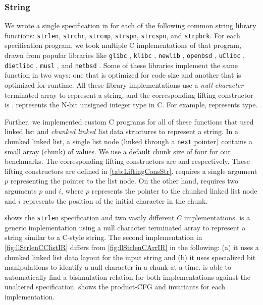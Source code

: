 

\subsubsection{String}
We wrote a single specification in \SpecL{} for each of the following
common string library functions: {\tt strlen}, {\tt strchr}, {\tt strcmp}, {\tt strspn},
{\tt strcspn}, and {\tt strpbrk}.  For each specification
program, we took multiple C implementations of that program, drawn from popular
libraries like {\tt glibc} \cite{glibc}, {\tt klibc} \cite{klibc}, {\tt newlib} \cite{newlib},
{\tt openbsd} \cite{openbsdlibc}, {\tt uClibc} \cite{uclibc},
{\tt dietlibc} \cite{dietlibc}, {\tt musl} \cite{musl}, and {\tt netbsd} \cite{netbsd}.
Some of these libraries implement the same function in two ways: one that is optimized
for code size and another that is optimized for runtime.
All these library implementations use a {\em null character} terminated array to represent
a string, and the
corresponding lifting constructor is .
 represents the N-bit unsigned integer type in C.
For example,  represents  type.

Further, we implemented
custom C programs for all of these functions that used
linked list
and {\em chunked linked list} data structures
to represent a string.
In a chunked linked list, a single list node (linked
through a {\tt next} pointer)
contains a small array (chunk) of values.
We use a default chunk size of four for our
benchmarks.
The corresponding lifting constructors are 
and  respectively.
These lifting constructors are defined in \cref{tab:LiftingConsStr}.
 requires a single
argument $p$ representing the pointer to the list node.
On the other hand,  requires two arguments $p$
and $i$, where $p$ represents the pointer to the chunked linked list node
and $i$ represents the position of the initial character in the chunk.

 shows the {\tt strlen} specification and two vastly
different $C$ implementations.  is a generic implementation
using a null character terminated array to represent a string similar to a C-style string.
The second implementation in \cref{fig:llStrlenCClistIR} differs from \cref{fig:llStrlenCArrIR}
in the following: (a) it uses a chunked linked list data layout for the input string
and (b) it uses specialized bit manipulations to identify a null character in a chunk at a time.
\toolName{} is able to automatically find a bisimulation relation
for both implementations against the unaltered specification.
 shows the product-CFG and invariants for each implementation.

